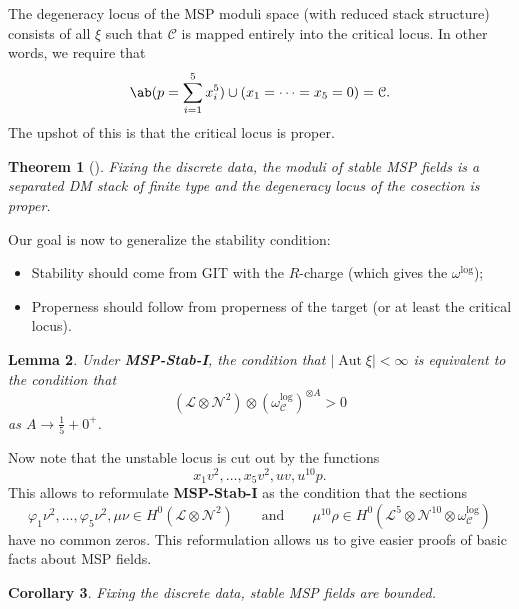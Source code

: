 \documentclass[10pt,oldfontcommands,oneside]{memoir}
\newtheorem{thm}{Theorem}[section]
\newtheorem{cor}[thm]{Corollary}
\newtheorem{lem}[thm]{Lemma}
\theoremstyle{definition}
\theoremstyle{remark}
\theoremstyle{plain}
\theoremstyle{definition}
\theoremstyle{remark}
\newcommand{\mc}[1]{\mathcal{#1}}
\newcommand{\1}{\mathbf{1}}
\newcommand{\2}{\mathbf{2}}
\newcommand{\3}{\mathbf{3}}
\DeclareMathOperator{\Aut}{Aut}
\begin{document}
The degeneracy locus of the MSP moduli space (with reduced stack structure) consists of all $\xi$ such that $\mc{C}$ is mapped entirely into the critical locus. In other words, we require that
\[ \ab(p = \sum_{i=1}^5 x_i^5) \cup (x_1 = \cdots = x_5 = 0) = \mc{C}. \]
The upshot of this is that the critical locus is proper.

\begin{thm}[\cite{mspfermat}]
    Fixing the discrete data, the moduli of stable MSP fields is a separated DM stack of finite type and the degeneracy locus of the cosection is proper.
\end{thm}

Our goal is now to generalize the stability condition:
\begin{itemize}
    \item Stability should come from GIT with the $R$-charge (which gives the $\omega^{\log}$);
    \item Properness should follow from properness of the target (or at least the critical locus).
\end{itemize}

\begin{lem}
        Under \textbf{MSP-Stab-I}, the condition that $|\Aut \xi|<\infty$ is equivalent to the condition that
        \[ (\mc{L} \otimes \mc{N}^2) \otimes ( \omega_{\mc{C}}^{\log} )^{\otimes A} > 0 \]
        as $A \to \frac{1}{5} + 0^+$.
\end{lem}

Now note that the unstable locus is cut out by the functions
\[ x_1 v^2, \ldots, x_5 v^2, uv, u^{10}p. \]
This allows to reformulate \textbf{MSP-Stab-I} as the condition that the sections
\[ \varphi_1 \nu^2, \ldots, \varphi_5 \nu^2, \mu\nu \in H^0(\mc{L} \otimes \mc{N}^2) \qquad \text{and} \qquad \mu^{10}\rho \in H^0(\mc{L}^5 \otimes \mc{N}^{10}\otimes \omega_{\mc{C}}^{\log}) \]
have no common zeros. This reformulation allows us to give easier proofs of basic facts about MSP fields.

\begin{cor}
    Fixing the discrete data, stable MSP fields are bounded.
\end{cor}
\end{document}
